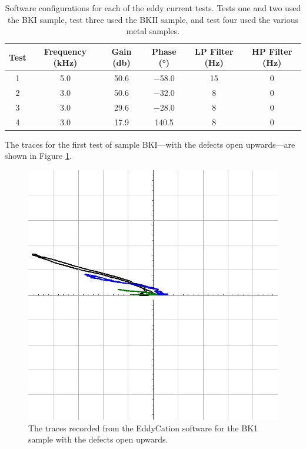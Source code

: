 \documentclass[12 pt]{report}
\begin{document}
\begin{table}[!htbp]
\caption{Software configurations for each of the eddy current tests. Tests one and two used the BKI sample, test three used the BKII sample, and test four used the various metal samples.}
\begin{center}
	\begin{tabular}{cccccc}
		\toprule
		Test&Frequency (\unit{\kilo\hertz})&Gain (\unit{\decibel})&Phase (\unit{\degree})&LP Filter (\unit{\hertz})&HP Filter (\unit{\hertz})\\
		\midrule
		1&\num{5.0}&\num{50.6}&\num{-58.0}&\num{15}&\num{0}\\
		2&\num{3.0}&\num{50.6}&\num{-32.0}&\num{8}&\num{0}\\
		3&\num{3.0}&\num{29.6}&\num{-28.0}&\num{8}&\num{0}\\
		4&\num{3.0}&\num{17.9}&\num{140.5}&\num{8}&\num{0}\\
		\bottomrule
	\end{tabular}
\end{center}
\label{tbl:ec}
\end{table}

The traces for the first test of sample BKI---with the defects open upwards---are shown in Figure \ref{fig:ec_bk1_up}.

\begin{figure}[htbp]
	\centering
	\includegraphics[width=6in]{images/graphs/eddy current testing/S4G2BK1-Upward}
	\caption{The traces recorded from the EddyCation software for the BK1 sample with the defects open upwards.}
	\label{fig:ec_bk1_up}
\end{figure}
\end{document}
